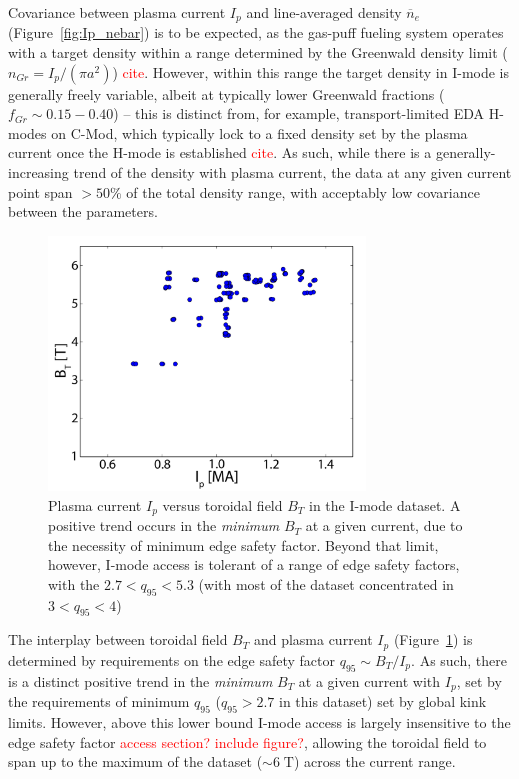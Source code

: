\documentclass[12pt]{iopart}
\renewcommand{\note}[1]{\textcolor{red}{#1}}
\begin{document}
Covariance between plasma current $I_p$ and line-averaged density $\overline{n}_e$ (Figure~\ref{fig:Ip_nebar}) is to be expected, as the gas-puff fueling system operates with a target density within a range determined by the Greenwald density limit ($n_{Gr} = I_p/(\pi a^2)$) \note{cite}.
However, within this range the target density in I-mode is generally freely variable, albeit at typically lower Greenwald fractions ($f_{Gr} \sim 0.15-0.40$) -- this is distinct from, for example, transport-limited EDA H-modes on C-Mod, which typically lock to a fixed density set by the plasma current once the H-mode is established \note{cite}.
As such, while there is a generally-increasing trend of the density with plasma current, the data at any given current point span $>50\%$ of the total density range, with acceptably low covariance between the parameters.

\begin{figure}[ht]
 \centering
 \includegraphics[width=0.75\textwidth]{Ip_Bt.pdf}
 \caption{Plasma current $I_p$ versus toroidal field $B_T$ in the I-mode dataset.  A positive trend occurs in the \emph{minimum} $B_T$ at a given current, due to the necessity of minimum edge safety factor.  Beyond that limit, however, I-mode access is tolerant of a range of edge safety factors, with the $2.7 < q_{95} < 5.3$ (with most of the dataset concentrated in $3 < q_{95} < 4$)}
 \label{fig:Ip_Bt}
\end{figure}

The interplay between toroidal field $B_T$ and plasma current $I_p$ (Figure~\ref{fig:Ip_Bt}) is determined by requirements on the edge safety factor $q_{95} \sim B_T/I_p$.
As such, there is a distinct positive trend in the \emph{minimum} $B_T$ at a given current with $I_p$, set by the requirements of minimum $q_{95}$ ($q_{95} > 2.7$ in this dataset) set by global kink limits.
However, above this lower bound I-mode access is largely insensitive to the edge safety factor \note{access section?  include figure?}, allowing the toroidal field to span up to the maximum of the dataset ($\sim 6\;\mbox{T}$) across the current range.
\end{document}
